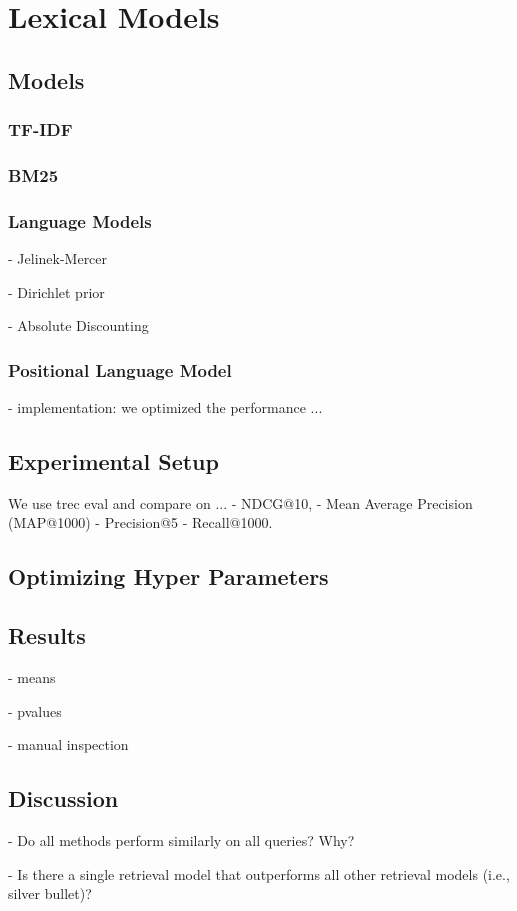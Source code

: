 \section{Lexical Models}

\subsection{Models}


\subsubsection{TF-IDF}

\subsubsection{BM25}

\subsubsection{Language Models}

- Jelinek-Mercer

- Dirichlet prior

- Absolute Discounting

\subsubsection{Positional Language Model}

- implementation: we optimized the performance ...


\subsection{Experimental Setup}



We use trec eval and compare on ...
- NDCG@10, 
- Mean Average Precision (MAP@1000) 
- Precision@5
- Recall@1000.

\subsection{Optimizing Hyper Parameters}


\subsection{Results}

- means



- pvalues

- manual inspection

\subsection{Discussion}

- Do all methods perform similarly on all queries? Why?

- Is there a single retrieval model that outperforms all other retrieval models (i.e., silver bullet)?